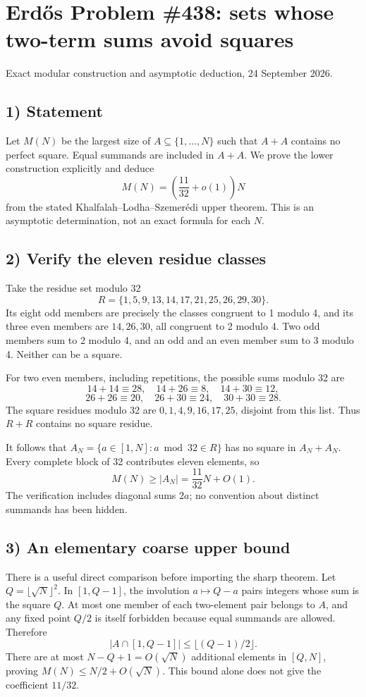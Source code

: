 \section{Erd\H{o}s Problem \#438: sets whose two-term sums avoid squares}
\noindent Exact modular construction and asymptotic deduction, 24 September 2026.

\subsection*{1) Statement}
Let $M(N)$ be the largest size of $A\subseteq\{1,\ldots,N\}$ such that $A+A$ contains no perfect square. Equal summands are included in $A+A$. We prove the lower construction explicitly and deduce
\[M(N)=\left(\frac{11}{32}+o(1)\right)N
\]
from the stated Khalfalah--Lodha--Szemer\'edi upper theorem. This is an asymptotic determination, not an exact formula for each $N$.

\subsection*{2) Verify the eleven residue classes}
Take the residue set modulo 32
\[R=\{1,5,9,13,14,17,21,25,26,29,30\}.
\]
Its eight odd members are precisely the classes congruent to 1 modulo 4, and its three even members are $14,26,30$, all congruent to 2 modulo 4. Two odd members sum to 2 modulo 4, and an odd and an even member sum to 3 modulo 4. Neither can be a square.

For two even members, including repetitions, the possible sums modulo 32 are
\[14+14\equiv28,\quad14+26\equiv8,\quad14+30\equiv12,
\]
\[26+26\equiv20,\quad26+30\equiv24,\quad30+30\equiv28.
\]
The square residues modulo 32 are $0,1,4,9,16,17,25$, disjoint from this list. Thus $R+R$ contains no square residue.

It follows that $A_N=\{a\in[1,N]:a\bmod32\in R\}$ has no square in $A_N+A_N$. Every complete block of 32 contributes eleven elements, so
\[M(N)\ge|A_N|=\frac{11}{32}N+O(1).\tag{1}\]
The verification includes diagonal sums $2a$; no convention about distinct summands has been hidden.

\subsection*{3) An elementary coarse upper bound}
There is a useful direct comparison before importing the sharp theorem. Let $Q=\lfloor\sqrt N\rfloor^2$. In $[1,Q-1]$, the involution $a\mapsto Q-a$ pairs integers whose sum is the square $Q$. At most one member of each two-element pair belongs to $A$, and any fixed point $Q/2$ is itself forbidden because equal summands are allowed. Therefore
\[|A\cap[1,Q-1]|\le\lfloor(Q-1)/2\rfloor.
\]
There are at most $N-Q+1=O(\sqrt N)$ additional elements in $[Q,N]$, proving $M(N)\le N/2+O(\sqrt N)$. This bound alone does not give the coefficient $11/32$.

